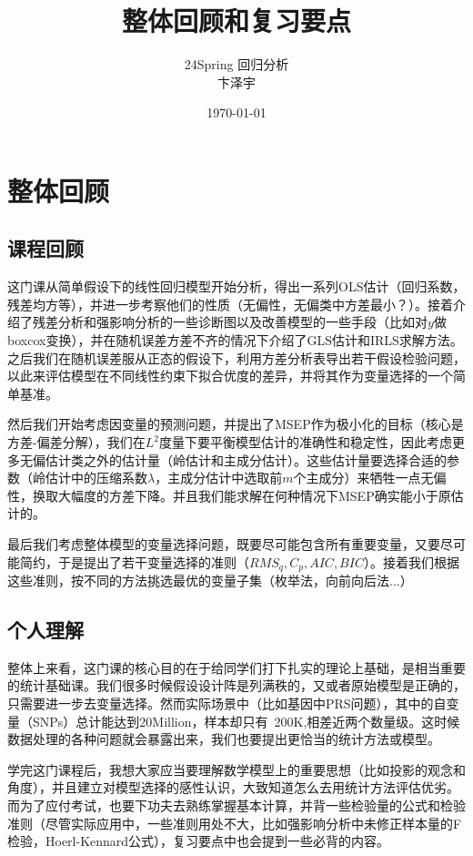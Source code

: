\documentclass[cn,hazy,green,12pt,normal]{elegantnote}
\title{整体回顾和复习要点}
\author{24Spring 回归分析\\
卞泽宇}
\date{\today}
\numberwithin{equation}{section}
\numberwithin{subsection}{section}
\begin{document}
\maketitle
\section{整体回顾}
\subsection{课程回顾}
这门课从简单假设下的线性回归模型开始分析，得出一系列OLS估计（回归系数，残差均方等），并进一步考察他们的性质（无偏性，无偏类中方差最小？）。接着介绍了残差分析和强影响分析的一些诊断图以及改善模型的一些手段（比如对$y$做boxcox变换），并在随机误差方差不齐的情况下介绍了GLS估计和IRLS求解方法。之后我们在随机误差服从正态的假设下，利用方差分析表导出若干假设检验问题，以此来评估模型在不同线性约束下拟合优度的差异，并将其作为变量选择的一个简单基准。

然后我们开始考虑因变量的预测问题，并提出了MSEP作为极小化的目标（核心是方差-偏差分解），我们在$L^2$度量下要平衡模型估计的准确性和稳定性，因此考虑更多无偏估计类之外的估计量（岭估计和主成分估计）。这些估计量要选择合适的参数（岭估计中的压缩系数$\lambda$，主成分估计中选取前$m$个主成分）来牺牲一点无偏性，换取大幅度的方差下降。并且我们能求解在何种情况下MSEP确实能小于原估计的。

最后我们考虑整体模型的变量选择问题，既要尽可能包含所有重要变量，又要尽可能简约，于是提出了若干变量选择的准则（$RMS_q, C_p, AIC, BIC$）。接着我们根据这些准则，按不同的方法挑选最优的变量子集（枚举法，向前向后法...）
\subsection{个人理解}
整体上来看，这门课的核心目的在于给同学们打下扎实的理论上基础，是相当重要的统计基础课。我们很多时候假设设计阵是列满秩的，又或者原始模型是正确的，只需要进一步去变量选择。然而实际场景中（比如基因中PRS问题），其中的自变量（SNPs）总计能达到20Million，样本却只有~200K,相差近两个数量级。这时候数据处理的各种问题就会暴露出来，我们也要提出更恰当的统计方法或模型。

学完这门课程后，我想大家应当要理解数学模型上的重要思想（比如投影的观念和角度），并且建立对模型选择的感性认识，大致知道怎么去用统计方法评估优劣。而为了应付考试，也要下功夫去熟练掌握基本计算，并背一些检验量的公式和检验准则（尽管实际应用中，一些准则用处不大，比如强影响分析中未修正样本量的F检验，Hoerl-Kennard公式），复习要点中也会提到一些必背的内容。
\end{document}
